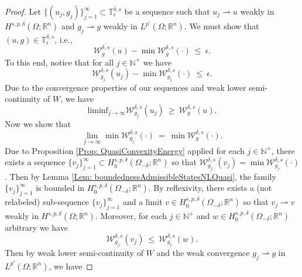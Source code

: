\documentclass[11pt, reqno]{amsart}   	%
\theoremstyle{plain}
\numberwithin{equation}{section}
\def\de{\delta}
\def\ep{\epsilon}
\def\Om{\Omega}
\def\N{\mathbb{N}}
\def\R{\mathbb{R}}
\def\liminf{\text{liminf}}
\begin{document}
    \begin{proof}
    Let $\{(u_j, g_j)\}^{\infty}_{j = 1} \subset \mathbb{T}^{\de, s}_{\ep}$ be a sequence such that $u_j \rightharpoonup u$ weakly in $H^{s, p, \de}(\Om; \R^n)$ and $g_j \rightharpoonup g$ weakly in $L^{p'}(\Om; \R^n)$. We must show that $(u, g) \in \mathbb{T}^{\de, s}_{\ep}$, i.e.,
    \begin{equation}\label{Eq: NLClosureOfMinimizationQuasiEq1}
        \mathcal{W}^{\de, s}_g(u) - \min \mathcal{W}^{\de, s}_g(\cdot) \ \leq \ \ep.
    \end{equation}
    To this end, notice that for all $j \in \N^+$ we have
     \begin{equation}\label{Eq: NLClosureOfMinimizationQuasiEq2}
        \mathcal{W}^{\de, s}_{g_j}(u_j) - \min \mathcal{W}^{\de, s}_{g_j}(\cdot) \ \leq \ \ep.
    \end{equation}
    Due to the convergence properties of our sequences and weak lower semi-continuity of $W$, we have
    \begin{equation}\label{Eq: NLClosureOfMinimizationQuasiEq3}
        \liminf_{j \rightarrow \infty}\mathcal{W}^{\de, s}_{g_j}(u_j) \ \geq \  \mathcal{W}^{\de, s}_g(u).  
    \end{equation}
   Now we show that
 \begin{equation}\label{Eq: NLClosureOfMinimizationQuasiEq4}
        \lim_{j \rightarrow \infty}\min \mathcal{W}^{\de, s}_{g_j}(\cdot) \ = \ \min \mathcal{W}^{\de, s}_g(\cdot).
    \end{equation}
    Due to Proposition \ref{Prop: QuasiConvexityEnergy} applied for each $j \in \N^+$, there exists a sequence $\{v_j\}^{\infty}_{j = 1} \subset H^{s, p, \de}_0(\Om_{-\de}; \R^n)$ so that $\mathcal{W}^{\de,  s}_{g_j}(v_j) = \min\mathcal{W}^{\de, s}_{g_j}(\cdot)$. Then by Lemma \ref{Lem: boundednessAdmissibleStatesNLQuasi}, the family $\{v_j\}^{\infty}_{j = 1}$ is bounded in $H^{s, p, \de}_0(\Om_{-\de}; \R^n)$.  By reflexivity, there exists a (not relabeled) sub-sequence $\{v_j\}^{\infty}_{j = 1}$ and a limit $v \in H^{s, p, \de}_0(\Om_{-\de}; \R^n)$ so that $v_j \rightharpoonup v$ weakly in $H^{s, p, \de}(\Om; \R^n)$. Moreover, for each $j \in \N^+$ and $w \in H^{s, p, \de}_0(\Om_{-\de}; \R^n)$ arbitrary we have
    \begin{equation}\label{Eq: NLClosureOfMinimizationQuasiEq5}
        \mathcal{W}^{\de, s}_{g_j}(v_j) \ \leq \ \mathcal{W}^{\de, s}_{g_j}(w).
    \end{equation}
    Then by weak lower semi-continuity of $W$ and the weak convergence $g_j \rightharpoonup g$ in $L^{p'}(\Om; \R^n)$, we have

\end{proof}
\end{document}
